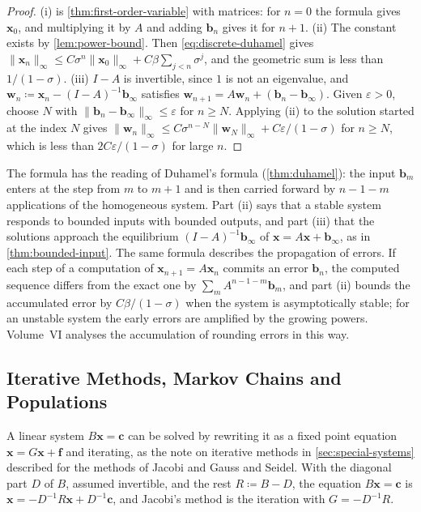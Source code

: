 \begin{proof}
(i) is \cref{thm:first-order-variable} with matrices: for $n=0$ the formula gives $\mathbf x_0$, and multiplying it by $A$ and adding $\mathbf b_n$ gives it for $n+1$. (ii) The constant exists by \cref{lem:power-bound}. Then \eqref{eq:discrete-duhamel} gives $\|\mathbf x_n\|_\infty\le C\sigma^n\|\mathbf x_0\|_\infty+C\beta\sum_{j<n}\sigma^j$, and the geometric sum is less than $1/(1-\sigma)$. (iii) $I-A$ is invertible, since $1$ is not an eigenvalue, and $\mathbf w_n\coloneqq\mathbf x_n-(I-A)^{-1}\mathbf b_\infty$ satisfies $\mathbf w_{n+1}=A\mathbf w_n+(\mathbf b_n-\mathbf b_\infty)$. Given $\varepsilon>0$, choose $N$ with $\|\mathbf b_n-\mathbf b_\infty\|_\infty\le\varepsilon$ for $n\ge N$. Applying (ii) to the solution started at the index $N$ gives $\|\mathbf w_n\|_\infty\le C\sigma^{n-N}\|\mathbf w_N\|_\infty+C\varepsilon/(1-\sigma)$ for $n\ge N$, which is less than $2C\varepsilon/(1-\sigma)$ for large $n$.
\end{proof}

The formula has the reading of Duhamel's formula (\cref{thm:duhamel}): the input $\mathbf b_m$ enters at the step from $m$ to $m+1$ and is then carried forward by $n-1-m$ applications of the homogeneous system. Part (ii) says that a stable system responds to bounded inputs with bounded outputs, and part (iii) that the solutions approach the equilibrium $(I-A)^{-1}\mathbf b_\infty$ of $\mathbf x=A\mathbf x+\mathbf b_\infty$, as in \cref{thm:bounded-input}. The same formula describes the propagation of errors. If each step of a computation of $\mathbf x_{n+1}=A\mathbf x_n$ commits an error $\mathbf b_n$, the computed sequence differs from the exact one by $\sum_mA^{n-1-m}\mathbf b_m$, and part (ii) bounds the accumulated error by $C\beta/(1-\sigma)$ when the system is asymptotically stable; for an unstable system the early errors are amplified by the growing powers. Volume~VI analyses the accumulation of rounding errors in this way.

\subsection{Iterative Methods, Markov Chains and Populations}

A linear system $B\mathbf x=\mathbf c$ can be solved by rewriting it as a fixed point equation $\mathbf x=G\mathbf x+\mathbf f$ and iterating, as the note on iterative methods in \cref{sec:special-systems} described for the methods of Jacobi and Gauss and Seidel. With the diagonal part $D$ of $B$, assumed invertible, and the rest $R\coloneqq B-D$, the equation $B\mathbf x=\mathbf c$ is $\mathbf x=-D^{-1}R\mathbf x+D^{-1}\mathbf c$, and Jacobi's method is the iteration with $G=-D^{-1}R$.

